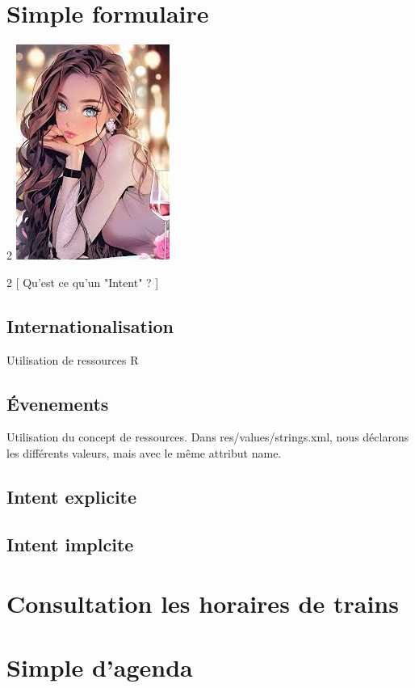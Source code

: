 \documentclass[a4paper]{article}
\begin{document}
\section{Simple formulaire}
\begin{multicols}{2}
  \includegraphics{cuteGirl.jpeg}
  \blindtext
\end{multicols}
\begin{multicols}{2}
  [ 
    Qu'est ce qu'un "Intent" ? 
  ]
  \subsection{Internationalisation}
  Utilisation de ressources R
  \blindtext
  \subsection{Évenements}
  Utilisation du concept de ressources. Dans res/values/strings.xml, nous déclarons les différents valeurs, mais avec le même attribut name.
  \blindtext
  \subsection{Intent explicite}
  
  \blindtext
  \subsection{Intent implcite}
  \blindtext
  \section{Consultation les horaires de trains}
  \blindtext
  \section{Simple d’agenda}
  \blindtext
\end{multicols}
\end{document}
